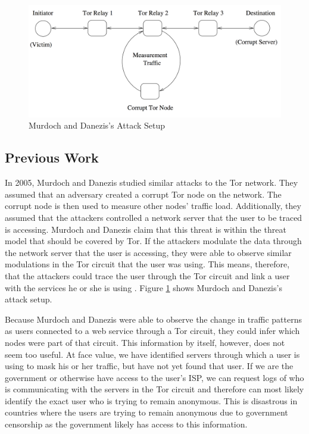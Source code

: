 \documentclass[12pt,journal]{IEEEtran}
\begin{document}
\begin{figure}

 \center
  \includegraphics[width=\textwidth]{figures/murdochattacksetup.png}
  \caption{Murdoch and Danezis's Attack Setup \cite{Murdoch:2005:LTA:1058433.1059390}}
  \label{murdochsetup}
\end{figure}

\subsection{Previous Work}
In 2005, Murdoch and Danezis studied similar attacks to the Tor network. They assumed that an adversary created a corrupt Tor node on the network. The corrupt node is then used to measure other nodes' traffic load. Additionally, they assumed that the attackers controlled a network server that the user to be traced is accessing. Murdoch and Danezis claim that this threat is within the threat model that should be covered by Tor. If the attackers modulate the data through the network server that the user is accessing, they were able to observe similar modulations in the Tor circuit that the user was using. This means, therefore, that the attackers could trace the user through the Tor circuit and link a user with the services he or she is using \cite{Murdoch:2005:LTA:1058433.1059390}. Figure \ref{murdochsetup} shows Murdoch and Danezis's attack setup.
\par
Because Murdoch and Danezis were able to observe the change in traffic patterns as users connected to a web service through a Tor circuit, they could infer which nodes were part of that circuit. This information by itself, however, does not seem too useful. At face value, we have identified servers through which a user is using to mask his or her traffic, but have not yet found that user. If we are the government or otherwise have access to the user’s ISP, we can request logs of who is communicating with the servers in the Tor circuit and therefore can most likely identify the exact user who is trying to remain anonymous. This is disastrous in countries where the users are trying to remain anonymous due to government censorship as the government likely has access to this information.
\end{document}
